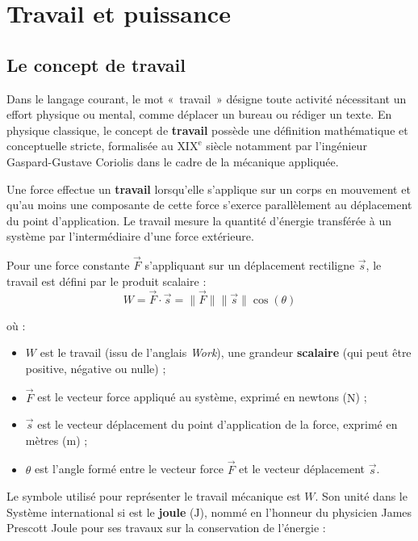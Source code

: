 \documentclass[11pt,openany]{book}
\begin{document}
\chapter{Travail et puissance}

\section{Le concept de travail}

Dans le langage courant, le mot «~travail~» désigne toute activité nécessitant un effort physique ou mental, comme déplacer un bureau ou rédiger un texte. En physique classique, le concept de \textbf{travail} possède une définition mathématique et conceptuelle stricte, formalisée au $\text{XIX}^\text{e}$ siècle notamment par l'ingénieur Gaspard-Gustave Coriolis dans le cadre de la mécanique appliquée.

\begin{definition}
Une force effectue un \textbf{travail} lorsqu'elle s'applique sur un corps en mouvement et qu'au moins une composante de cette force s'exerce parallèlement au déplacement du point d'application. Le travail mesure la quantité d'énergie transférée à un système par l'intermédiaire d'une force extérieure.

Pour une force constante $\vec{F}$ s'appliquant sur un déplacement rectiligne $\vec{s}$, le travail est défini par le produit scalaire :
\[ W = \vec{F} \cdot \vec{s} = \|\vec{F}\| \|\vec{s}\| \cos(\theta) \]

où :
\begin{itemize}
    \item $W$ est le travail (issu de l'anglais \textit{Work}), une grandeur \textbf{scalaire} (qui peut être positive, négative ou nulle) ;
    \item $\vec{F}$ est le vecteur force appliqué au système, exprimé en newtons ($\mathrm{N}$) ;
    \item $\vec{s}$ est le vecteur déplacement du point d'application de la force, exprimé en mètres ($\mathrm{m}$) ;
    \item $\theta$ est l'angle formé entre le vecteur force $\vec{F}$ et le vecteur déplacement $\vec{s}$.
\end{itemize}
\end{definition}

Le symbole utilisé pour représenter le travail mécanique est $W$. Son unité dans le Système international \gls{si} est le \textbf{joule} ($\mathrm{J}$), nommé en l'honneur du physicien James Prescott Joule pour ses travaux sur la conservation de l'énergie :
\end{document}
